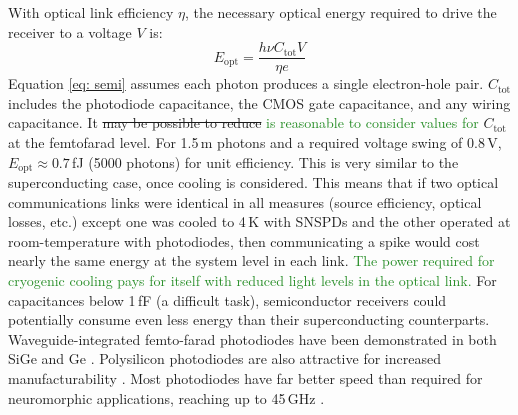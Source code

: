 \documentclass[twocolumn]{article}
\begin{document}
With optical link efficiency $\eta$, the necessary optical energy required to drive the receiver \cite{miller2017attojoule} to a voltage $V$ is:
\begin{equation}
\label{eq: semi}
    E_{\mathrm{opt}} = \frac{h \nu C_{\mathrm{tot}} V}{\eta e}
\end{equation}
Equation \ref{eq: semi} assumes each photon produces a single electron-hole pair. $C_{\mathrm{tot}}$ includes the photodiode capacitance, the CMOS gate capacitance, and any wiring capacitance. It \sout{may be possible to reduce} \textcolor{ForestGreen}{is reasonable to consider values for} $C_{\mathrm{tot}}$ at the femtofarad level. For 1.5\,\textmu m photons and a required voltage swing of 0.8\,V, $E_{\mathrm{opt}} \approx 0.7 $\,fJ (5000 photons) for unit efficiency. This is very similar to the superconducting case, once cooling is considered. This means that if two optical communications links were identical in all measures (source efficiency, optical losses, etc.) except one was cooled to 4\,K with SNSPDs and the other operated at room-temperature with photodiodes, then communicating a spike would cost nearly the same energy at the system level in each link. \textcolor{ForestGreen}{The power required for cryogenic cooling pays for itself with reduced light levels in the optical link.} For capacitances below 1\,fF (a difficult task), semiconductor receivers could potentially consume even less energy than their superconducting counterparts. Waveguide-integrated femto-farad photodiodes have been demonstrated in both SiGe and Ge \cite{derose2011ultra}. Polysilicon photodiodes are also attractive for increased manufacturability \cite{meor2014}. Most photodiodes have far better speed than required for neuromorphic applications, reaching up to 45\,GHz \cite{derose2011ultra}.
\end{document}

